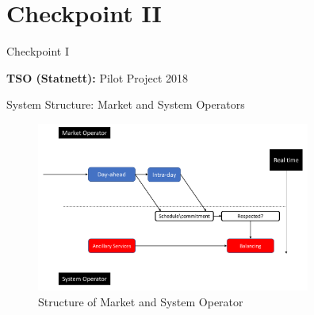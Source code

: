 \documentclass{beamer}
\begin{document}
\section{Checkpoint II}
\begin{frame}{Checkpoint I}
\centering \begin{block}{}
\textbf{TSO (Statnett):} Pilot Project 2018
\end{block} 
\end{frame}
\begin{frame}{System Structure: Market and System Operators}
\addtocounter{figure}{1}

\begin{figure}
\includegraphics[width=90mm]{Figures/MarketModel.png}
\caption{Structure of Market and System Operator} 
\end{figure}

\end{frame}
\end{document}
